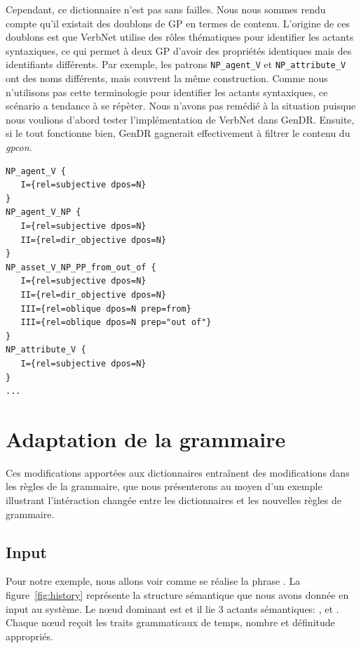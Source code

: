 Cependant, ce dictionnaire n'est pas sans failles. Nous nous sommes rendu compte qu'il existait des doublons de \ac{GP} en termes de contenu. L'origine de ces doublons est que VerbNet utilise des rôles thématiques pour identifier les actants syntaxiques, ce qui permet à deux \ac{GP} d'avoir des propriétés identiques mais des identifiants différents. Par exemple, les patrons \texttt{NP\_agent\_V} et \texttt{NP\_attribute\_V} ont des noms différents, mais couvrent la même construction. Comme nous n'utilisons pas cette terminologie pour identifier les actants syntaxiques, ce scénario a tendance à se répèter. Nous n'avons pas remédié à la situation puisque nous voulions d'abord tester l'implémentation de VerbNet dans GenDR. Ensuite, si le tout fonctionne bien, GenDR gagnerait effectivement à filtrer le contenu du \emph{gpcon}.

\begin{lstlisting}[language=mate, caption = Extrait du \emph{gpcon}]
NP_agent_V {
   I={rel=subjective dpos=N}
}
NP_agent_V_NP {
   I={rel=subjective dpos=N}
   II={rel=dir_objective dpos=N}
}
NP_asset_V_NP_PP_from_out_of {
   I={rel=subjective dpos=N}
   II={rel=dir_objective dpos=N}
   III={rel=oblique dpos=N prep=from}
   III={rel=oblique dpos=N prep="out of"}
}
NP_attribute_V {
   I={rel=subjective dpos=N}
}
...
\end{lstlisting}

\section{Adaptation de la grammaire}

Ces modifications apportées aux dictionnaires entraînent des modifications dans les règles de la grammaire, que nous présenterons au moyen d'un exemple illustrant l'intéraction changée entre les dictionnaires et les nouvelles règles de grammaire.

\subsection{Input}

Pour notre exemple, nous allons voir comme se réalise la phrase . La figure~\ref{fig:history} représente la structure sémantique que nous avons donnée en input au système. Le n\oe{}ud dominant est  et il lie 3 actants sémantiques: ,  et . Chaque n\oe{}ud reçoit les traits grammaticaux de temps, nombre et définitude appropriés.

